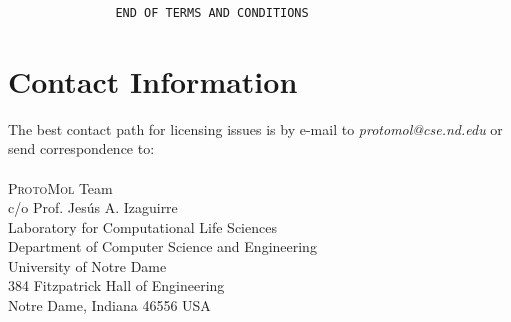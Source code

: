 \documentclass[11pt]{report}
\newcommand{\ProtoMol}{\textsc{ProtoMol }}
\begin{document}
\begin{appendix}
\begin{verbatim}
               END OF TERMS AND CONDITIONS

\end{verbatim}
\normalsize
\section{Contact Information}

The best contact path for licensing issues is by e-mail to  
{\it protomol@cse.nd.edu} or send correspondence to: \\ \\
\ProtoMol Team\\
c/o Prof. Jes\'{u}s A. Izaguirre\\
Laboratory for Computational Life Sciences\\
Department of Computer Science and Engineering\\
University of Notre Dame\\
384 Fitzpatrick Hall of Engineering\\
Notre Dame, Indiana 46556 USA

\end{appendix}




                                     
\end{document}
